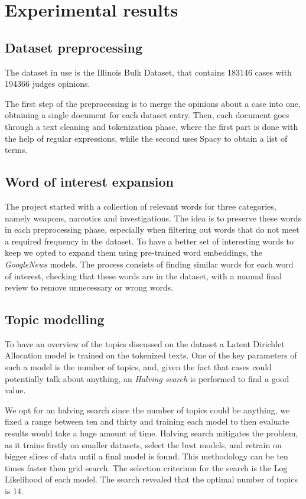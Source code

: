 \section{Experimental results}

\subsection{Dataset preprocessing}

The dataset in use is the Illinois Bulk Dataset, that contains 
183146 cases with 194366 judges opinions. 

The first step of the preprocessing is to merge the opinions about a 
case into one, obtaining a single document for each dataset entry.  
Then, each document goes through a text cleaning and tokenization phase, 
where the first part is done with the help of regular expressions, 
while the second uses Spacy to obtain a list of terms.

\subsection{Word of interest expansion}

The project started with a collection of relevant words for three categories, 
namely weapons, narcotics and investigations. The idea is to preserve these words
in each preprocessing phase, especially when filtering out words 
that do not meet a required frequency in the dataset. 
To have a better set of interesting words to keep we opted to expand them 
using pre-trained word embeddings, the \emph{GoogleNews} models.
The process consists of finding similar words for each word 
of interest, checking that these words are in the dataset, 
with a manual final review to remove unnecessary or wrong words.

\subsection{Topic modelling}

To have an overview of the topics discussed on the dataset a Latent 
Dirichlet Allocation model is trained on the tokenized texts.
One of the key parameters of such a model is the number of topics, and, 
given the fact that cases could potentially talk about anything, an 
\emph{Halving search} is performed to find a good value.

We opt for an halving search since the number of topics could be anything, 
we fixed a range between ten and thirty and training each model 
to then evaluate results would take a huge amount of time. Halving search 
mitigates the problem, as it trains firstly on smaller datasets, select 
the best models, and retrain on bigger slices of data until a final model 
is found. This methodology can be ten times faster then grid search. 
The selection criterium for the search is the Log Likelihood of each model.
The search revealed that the optimal number of topics is 14.

